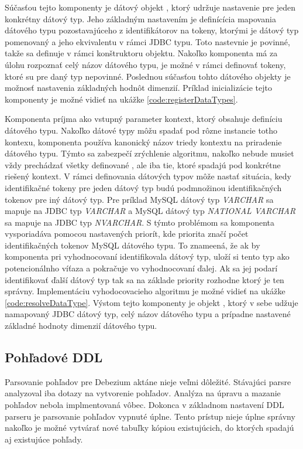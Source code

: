 Súčasťou tejto komponenty je dátový objekt , ktorý udržuje nastavenie pre jeden konkrétny dátový typ. Jeho základným nastavením je definícícia mapovania dátového typu pozostavajúceho z identifikátorov na tokeny, ktorými je dátový typ pomenovaný a jeho ekvivalentu v rámci JDBC typu. Toto nastevnie je povinné, takže sa definuje v rámci konštruktoru  objektu. Nakoľko komponenta  má za úlohu rozpoznať celý názov dátového typu, je možné v rámci  definovať tokeny, ktoré su pre daný typ nepovinné. Poslednou súčasťou tohto dátového objekty je možnosť nastavenia základných hodnôt dimenzií. Príklad inicializácie tejto komponenty je možné vidieť na ukážke \ref{code:registerDataTypes}.

Komponenta  príjma ako vstupný parameter kontext, ktorý obsahuje definíciu dátového typu. Nakoľko dátové typy môžu spadať pod rôzne instancie totho kontexu, komponenta používa kanonický názov triedy kontextu na priradenie dátového typu. Týmto sa zabezpečí zrýchlenie algoritmu, nakoľko  nebude musiet vždy prechádzať všetky definované , ale iba tie, ktoré spadajú pod konkrétne riešený kontext. V rámci definovania dátových typov môže nastať situácia, kedy identifikačné tokeny pre jeden dátový typ budú podmnožinou identifikačných tokenov pre iný dátový typ. Pre príklad MySQL dátový typ \textit{VARCHAR} sa mapuje na  JDBC typ \textit{VARCHAR} a MySQL dátový typ \textit{NATIONAL VARCHAR} sa mapuje na JDBC typ \textit{NVARCHAR}. S týmto problémom sa komponenta vysporiadáva pomocou nastavených priorít, kde priorita značí počet identifikačných tokenov MySQL dátového typu. To znameená, že ak by komponenta pri vyhodnocovaní identifikovala dátový typ, uloží si tento typ ako potencionálnho víťaza a pokračuje vo vyhodnocovaní ďalej. Ak sa jej podarí identifikovať ďalší dátový typ tak sa na základe priority rozhodne ktorý je ten správny. Implementáciu vyhodocovacieho algoritmu je možné vidieť na ukážke \ref{code:resolveDataType}. Výstom tejto komponenty je objekt , ktorý v sebe udžuje namapovaný JDBC dátový typ, celý názov dátového typu a prípadne nastavené základné hodnoty dimenzií dátového typu.

\subsection{Pohľadové DDL}
Parsovanie pohľadov pre Debezium aktáne nieje veľmi dôležité. Stávajúci parsre analyzoval iba dotazy na vytvorenie pohľadov. Analýza na úpravu a mazanie pohľadov nebola implmentovaná vôbec. Dokonca v základnom nastavení DDL parseru je parsovanie pohľadov vypnuté úplne. Tento prístup nieje úplne správny nakoľko je možné vytvárať nové tabuľky kópiou existujúcich, do ktorých spadajú aj existujúce pohľady.

